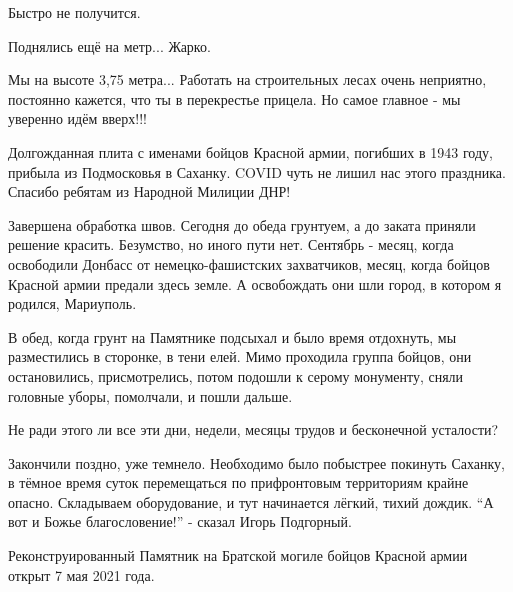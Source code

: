 \begin{multicols}{2}
Быстро не получится.



Поднялись ещё на метр... Жарко.


Мы на высоте 3,75 метра... Работать на строительных лесах очень неприятно,
постоянно кажется, что ты в перекрестье прицела. Но самое главное - мы уверенно
идём вверх!!!



Долгожданная плита с именами бойцов Красной армии, погибших в 1943 году,
прибыла из Подмосковья в Саханку. COVID чуть не лишил нас этого праздника.
Спасибо ребятам из Народной Милиции ДНР!


Завершена обработка швов. Сегодня до обеда грунтуем, а до заката приняли
решение красить. Безумство, но иного пути нет. Сентябрь - месяц, когда
освободили Донбасс от немецко-фашистских захватчиков, месяц, когда бойцов
Красной армии предали здесь земле. А освобождать они шли город, в котором я
родился, Мариуполь.

В обед, когда грунт на Памятнике подсыхал и было время отдохнуть, мы
разместились в сторонке, в тени елей. Мимо проходила группа бойцов, они
остановились, присмотрелись, потом подошли к серому монументу, сняли головные
уборы, помолчали, и пошли дальше.

Не ради этого ли все эти дни, недели, месяцы трудов и бесконечной усталости?

Закончили поздно, уже темнело. Необходимо было побыстрее покинуть Саханку, в
тёмное время суток перемещаться по прифронтовым территориям крайне опасно.
Складываем оборудование, и тут начинается лёгкий, тихий дождик. \enquote{А вот и Божье
благословение!} - сказал Игорь Подгорный.

Реконструированный Памятник на Братской могиле бойцов Красной армии открыт 7
мая 2021 года.



\end{multicols} %
